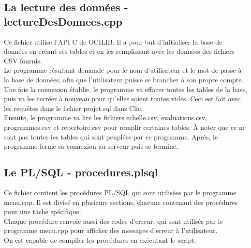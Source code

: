 \documentclass[a4paper,12pt]{article}
\begin{document}
\subsection{La lecture des données - lectureDesDonnees.cpp}
\indent Ce fichier utilise l'API C de OCILIB. Il a pour but d'initialiser la base de données en créant ses tables et en les remplissant avec les données des fichiers CSV fournis. \\
\indent Le programme résultant demande pour le nom d'utilisateur et le mot de passe à la base de données, afin que l'utilisateur puisse se brancher à son propre
compte. Une fois la connexion établie, le programme va effacer toutes les tables de la base, puis va les recréer à nouveau pour
qu'elles soient toutes vides. Ceci est fait avec les requêtes dans le fichier projet.sql dans Clic. \\
\indent Ensuite, le programme va lire les fichiers echelle.csv, evaluations.csv, programmes.csv et repertoire.csv pour remplir certaines tables.
À noter que ce ne sont pas toutes les tables qui sont peuplées par ce programme. Après, le programme ferme sa connexion au serveur puis se termine.

\subsection{Le PL/SQL - procedures.plsql}
Ce fichier contient les procédures PL/SQL qui sont utilisées par le programme menu.cpp. Il est divisé en plusieurs sections, chacune contenant des procédures
pour une tâche spécifique. \\
\indent Chaque procédure renvoie aussi des codes d'erreur, qui sont utilisés par le programme menu.cpp pour afficher des messages d'erreur à l'utilisateur. \\
\indent On est capable de compiler les procédures en exécutant le script.
\end{document}
